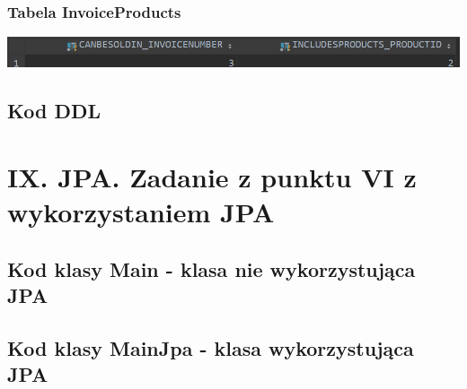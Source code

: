 \documentclass[a4paper, 11pt]{article}
\begin{document}
    \subsubsection{Tabela InvoiceProducts}
    \begin{center}
        \includegraphics[scale=0.85]{images/point7/SelectInvoiceProducts.png}
    \end{center}

    \newpage

    \subsection{Kod DDL}
    

    \newpage



    \section{IX. JPA. Zadanie z punktu VI z wykorzystaniem JPA}

    \subsection{Kod klasy Main - klasa nie wykorzystująca JPA}
    

    \newpage

    \subsection{Kod klasy MainJpa - klasa wykorzystująca JPA}
    

    \newpage
\end{document}
